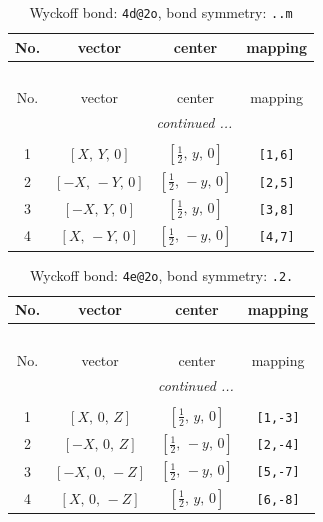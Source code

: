 \documentclass[fleqn,8pt]{jsarticle}
\begin{document}
\begin{longtable}{cccc}
\caption{Wyckoff bond: {\tt 4d@2o}, bond symmetry: {\tt ..m}}
 \\
 \hline \hline
No. & vector & center & mapping \\ \hline \endfirsthead

\multicolumn{3}{l}{\tablename\ \thetable{}} \\
 \hline \hline
No. & vector & center & mapping \\ \hline \endhead

 \hline \hline
\multicolumn{3}{r}{\footnotesize\it continued ...} \\ \endfoot

 \hline \hline
\multicolumn{3}{r}{} \\ \endlastfoot

1 & $\left[ X,\, Y,\, 0 \right]$ & $\left[ \frac{1}{2},\, y,\, 0 \right]$ & {\tt [1,6]} \\ \hline
2 & $\left[ - X,\, - Y,\, 0 \right]$ & $\left[ \frac{1}{2},\, - y,\, 0 \right]$ & {\tt [2,5]} \\ \hline
3 & $\left[ - X,\, Y,\, 0 \right]$ & $\left[ \frac{1}{2},\, y,\, 0 \right]$ & {\tt [3,8]} \\ \hline
4 & $\left[ X,\, - Y,\, 0 \right]$ & $\left[ \frac{1}{2},\, - y,\, 0 \right]$ & {\tt [4,7]} \\
\end{longtable}
\renewcommand{\arraystretch}{1.2}
\begin{longtable}{cccc}
\caption{Wyckoff bond: {\tt 4e@2o}, bond symmetry: {\tt .2.}}
 \\
 \hline \hline
No. & vector & center & mapping \\ \hline \endfirsthead

\multicolumn{3}{l}{\tablename\ \thetable{}} \\
 \hline \hline
No. & vector & center & mapping \\ \hline \endhead

 \hline \hline
\multicolumn{3}{r}{\footnotesize\it continued ...} \\ \endfoot

 \hline \hline
\multicolumn{3}{r}{} \\ \endlastfoot

1 & $\left[ X,\, 0,\, Z \right]$ & $\left[ \frac{1}{2},\, y,\, 0 \right]$ & {\tt [1,-3]} \\ \hline
2 & $\left[ - X,\, 0,\, Z \right]$ & $\left[ \frac{1}{2},\, - y,\, 0 \right]$ & {\tt [2,-4]} \\ \hline
3 & $\left[ - X,\, 0,\, - Z \right]$ & $\left[ \frac{1}{2},\, - y,\, 0 \right]$ & {\tt [5,-7]} \\ \hline
4 & $\left[ X,\, 0,\, - Z \right]$ & $\left[ \frac{1}{2},\, y,\, 0 \right]$ & {\tt [6,-8]} \\
\end{longtable}
\end{document}
